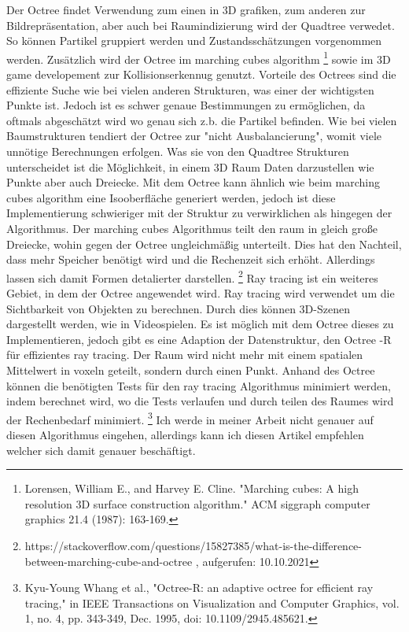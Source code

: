 \documentclass[11pt]{article}
\newcommand{\qt}{Quadtree }
\newcommand{\oc}{Octree }
\newcommand{\ocs}{Octrees }
\begin{document}
Der \oc findet Verwendung zum einen in 3D grafiken, zum anderen zur Bildrepräsentation, aber auch bei Raumindizierung wird der \qt verwedet. So können Partikel gruppiert werden und Zustandsschätzungen vorgenommen werden. Zusätzlich wird der \oc im marching cubes algorithm \footnote[1]{Lorensen, William E., and Harvey E. Cline. "Marching cubes: A high resolution 3D surface construction algorithm." ACM siggraph computer graphics 21.4 (1987): 163-169.} sowie im 3D game developement zur Kollisionserkennug genutzt. 
\newline
Vorteile des \ocs sind die effiziente Suche wie bei vielen anderen Strukturen, was einer der wichtigsten Punkte ist. Jedoch ist es schwer genaue Bestimmungen zu ermöglichen, da oftmals abgeschätzt wird wo genau sich z.b. die Partikel befinden. Wie bei vielen Baumstrukturen tendiert der \oc zur "nicht Ausbalancierung", womit viele unnötige Berechnungen erfolgen. 
Was sie von den \qt Strukturen unterscheidet ist die Möglichkeit, in einem 3D Raum Daten darzustellen wie Punkte aber auch Dreiecke. Mit dem \oc kann ähnlich wie beim marching cubes algorithm eine Isooberfläche generiert werden, jedoch ist diese Implementierung schwieriger mit der Struktur zu verwirklichen als hingegen der Algorithmus. 
Der marching cubes Algorithmus teilt den raum in gleich große Dreiecke, wohin gegen der \oc ungleichmäßig unterteilt. Dies hat den Nachteil, dass mehr Speicher benötigt wird und die Rechenzeit sich erhöht. Allerdings lassen sich damit Formen detalierter darstellen. \footnote[2]{https://stackoverflow.com/questions/15827385/what-is-the-difference-between-marching-cube-and-octree , aufgerufen: 10.10.2021}
\newline
Ray tracing ist ein weiteres Gebiet, in dem der \oc angewendet wird. Ray tracing wird verwendet um die Sichtbarkeit von Objekten zu berechnen. Durch dies können 3D-Szenen dargestellt werden, wie in Videospielen.  Es ist möglich mit dem \oc dieses zu Implementieren, jedoch gibt es eine Adaption der Datenstruktur, den \oc -R für effizientes ray tracing. Der Raum wird nicht mehr mit einem spatialen Mittelwert in voxeln geteilt, sondern durch einen Punkt. 
Anhand des \oc können die benötigten Tests für den ray tracing Algorithmus minimiert werden, indem berechnet wird, wo die Tests verlaufen und durch teilen des Raumes wird der Rechenbedarf minimiert.  \footnote[3]{Kyu-Young Whang et al., "Octree-R: an adaptive octree for efficient ray tracing," in IEEE Transactions on Visualization and Computer Graphics, vol. 1, no. 4, pp. 343-349, Dec. 1995, doi: 10.1109/2945.485621.}
Ich werde in meiner Arbeit nicht genauer auf diesen Algorithmus eingehen, allerdings kann ich diesen Artikel empfehlen welcher sich damit genauer beschäftigt. \cite{RaytracingOctree}
\end{document}
